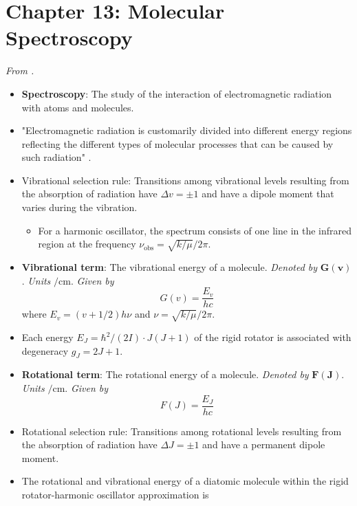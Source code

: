 \documentclass[../notes.tex]{subfiles}
\begin{document}
\section{Chapter 13: Molecular Spectroscopy}
\emph{From \textcite{bib:McQuarrieSimon}.}
\begin{itemize}
    \item {}\textbf{Spectroscopy}: The study of the interaction of electromagnetic radiation with atoms and molecules.
    \item "Electromagnetic radiation is customarily divided into different energy regions reflecting the different types of molecular processes that can be caused by such radiation" \parencite[495-96]{bib:McQuarrieSimon}.
    \item Vibrational selection rule: Transitions among vibrational levels resulting from the absorption of radiation have $\Delta v=\pm 1$ and have a dipole moment that varies during the vibration.
    \begin{itemize}
        \item For a harmonic oscillator, the spectrum consists of one line in the infrared region at the frequency $\nu_\text{obs}=\sqrt{k/\mu}/2\pi$.
    \end{itemize}
    \item \textbf{Vibrational term}: The vibrational energy of a molecule. \emph{Denoted by} $\bm{G(v)}$. \emph{Units} $\si{\per\centi\meter}$. \emph{Given by}
    \begin{equation*}
        G(v) = \frac{E_v}{hc}
    \end{equation*}
    where $E_v=(v+1/2)h\nu$ and $\nu=\sqrt{k/\mu}/2\pi$.
    \item Each energy $E_J=\hbar^2/(2I)\cdot J(J+1)$ of the rigid rotator is associated with degeneracy $g_J=2J+1$.
    \item {}\textbf{Rotational term}: The rotational energy of a molecule. \emph{Denoted by} $\bm{F(J)}$. \emph{Units} $\si{\per\centi\meter}$. \emph{Given by}
    \begin{equation*}
        F(J) = \frac{E_J}{hc}
    \end{equation*}
    \item Rotational selection rule: Transitions among rotational levels resulting from the absorption of radiation have $\Delta J=\pm 1$ and have a permanent dipole moment.
    \item The rotational and vibrational energy of a diatomic molecule within the rigid rotator-harmonic oscillator approximation is

\end{itemize}
\end{document}
